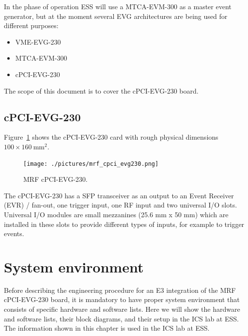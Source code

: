\documentclass[11pt
  , a4paper
  , article
  , oneside
  , showtrims
]{memoir}
\begin{document}
In the phase of operation ESS will use a MTCA-EVM-300 as a master event generator, but at the moment several EVG architectures are being used for different purposes:
\begin{itemize}
\item VME-EVG-230
\item MTCA-EVM-300
\item cPCI-EVG-230
\end{itemize}

The scope of this document is to cover the cPCI-EVG-230 board.


\section{cPCI-EVG-230}
Figure~\ref{fig:cpci-evg230} shows the cPCI-EVG-230 card with rough physical dimensions $100\times 160~\mathrm{mm}{}^2$.

\begin{figure}[!htb]
  \centering
  \texttt{[image: ./pictures/mrf\_cpci\_evg230.png]}
  \caption{
    MRF cPCI-EVG-230.
  }
  \label{fig:cpci-evg230}
\end{figure}


The cPCI-EVG-230  has a SFP transceiver as an output to an Event Receiver (EVR) / fan-out, one trigger input, one RF input and two universal I/O slots. Universal I/O modules are small mezzanines (25.6 mm x 50 mm) which are installed in these slots to provide different types of inputs, for example to trigger events.


\clearpage

\chapter{System environment}
Before describing the engineering procedure for an E3 integration of the MRF cPCI-EVG-230 board, it is mandatory to have proper system environment that consists of specific hardware and software lists. Here we will show the hardware and software lists, their block diagrams, and their setup in the ICS lab at ESS. The information shown in this chapter is used in the ICS lab at ESS.
\end{document}

